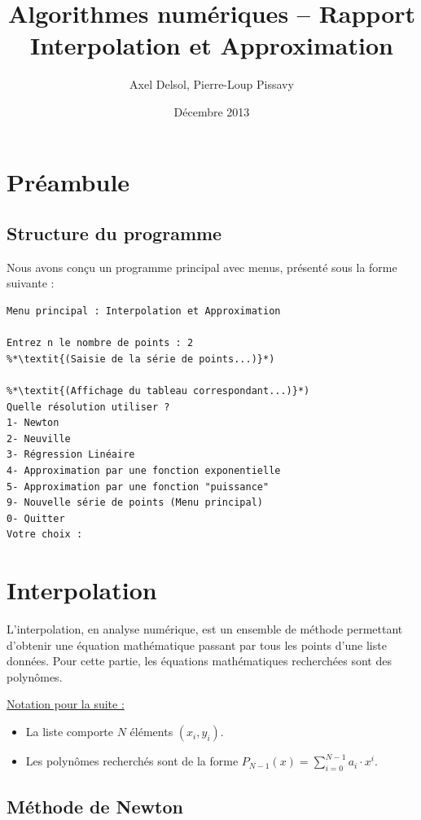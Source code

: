 \documentclass{report}
\title{Algorithmes numériques -- Rapport \\ \vspace{0.5cm}Interpolation et Approximation}
\author{Axel Delsol, Pierre-Loup Pissavy}
\date{Décembre 2013}
\begin{document}
  \maketitle
  \tableofcontents

  \chapter{Préambule}
    \section{Structure du programme}
    Nous avons conçu un programme principal avec menus, présenté sous la forme suivante :
    \begin{lstlisting}[style=apercu, name=Menu Principal]
Menu principal : Interpolation et Approximation

Entrez n le nombre de points : 2
%*\textit{(Saisie de la série de points...)}*)

%*\textit{(Affichage du tableau correspondant...)}*)
Quelle résolution utiliser ?
1- Newton
2- Neuville
3- Régression Linéaire
4- Approximation par une fonction exponentielle
5- Approximation par une fonction "puissance"
9- Nouvelle série de points (Menu principal)
0- Quitter
Votre choix :
    \end{lstlisting}
  \chapter{Interpolation}
  	\noindent L'interpolation, en analyse numérique, est un ensemble de méthode permettant d'obtenir une équation mathématique passant par tous les points d'une liste données.
  	\newline
  	Pour cette partie, les équations mathématiques recherchées sont des polynômes.
  	\newline
  	
  	\underline{Notation pour la suite :}
  	\vspace{0.1 cm}
  	\begin{itemize}
  	\item{La liste comporte $N$ éléments $(x_{i},y_{i})$.}
  	\item{Les polynômes recherchés sont de la forme $P_{N-1}(x)= \sum_{i=0}^{N-1} a_{i} \cdot x^{i}$.}
  	\end{itemize}
    \section{Méthode de Newton}
\end{document}
